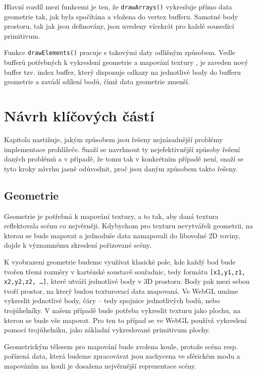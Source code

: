 Hlavní rozdíl mezi funkcemi je ten, že \texttt{drawArrays()} vykresluje přímo data geometrie tak,  jak byla spočítána a vložena do vertex bufferu. Samotné body prostoru, tak jak jsou definovány, jsou uvedeny vícekrát pro každé sousedící primitivum.

Funkce \texttt{drawElements()} pracuje s takovými daty odlišným způsobem. Vedle bufferů potřebných k vykreslení geometrie a mapování textury , je zaveden nový buffer tzv. index buffer, který disponuje odkazy na jednotlivé body do bufferu geometrie a zavádí sdílení bodů, čímž data geometrie zmenší. 

 



\newpage

\chapter{Návrh klíčových částí}
\label{chapter:3}
Kapitola nastiňuje, jakým způsobem jsou řešeny nejzásadnější problémy implementace prohlížeče. Snaží se navrhnout ty nejefektivnější způsoby řešení daných problémů a v případě, že tomu tak v konkrétním případě není, snaží se tyto  kroky návrhu jasně odůvodnit, proč jsou  daným způsobem takto řešeny.


\section{Geometrie}
Geometrie je potřebná k mapování textury, a to tak, aby daná textura reflektovala scénu co nejvěrněji. Kdybychom pro texturu nevytvářeli geometrii, na kterou se bude mapovat a jednoduše data namapovali do libovolné 2D roviny, dojde k významnému zkreslení pořizované scény.

K vyobrazení geometrie budeme využívat klasické pole, kde každý bod bude tvořen třemi rozměry v kartézské soustavě souřadnic, tedy formátu \texttt{[x1,y1,z1, x2,y2,z2, …]}, které utváří jednotlivé body v 3D prostoru. Body pak mezi sebou tvoří prostor, na který budou texturovací data  mapovaná. Ve WebGL umíme vykreslit jednotlivé body, čáry – tedy spojnice jednotlivých bodů, nebo trojúhelníky. V našem případě bude potřeba vykreslit texturu jako plochu, na kterou se bude vše mapovat. Pro ten to případ se ve WebGL používá vykreslení pomocí trojúhelníku, jako základní vykreslované primitivum plochy.

Geometrickým tělesem pro mapování bude zvolena koule, protože scéna resp. pořízená data, která budeme zpracovávat jsou zachycena ve sférickém modu a mapováním na kouli je dosažena nejvěrnější reprezentace scény.

